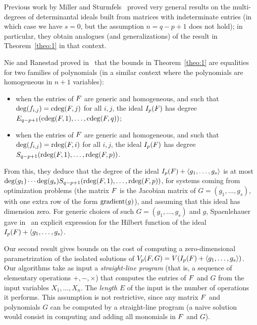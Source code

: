 \documentclass[12pt]{article}
\begin{document}
Previous work by Miller and Sturmfels~\cite[Chapter~15]{MiSt04} proved
very general results on the multi-degrees of determinantal ideals
built from matrices with indeterminate entries (in which case we have
$s=0$, but the assumption $n=q-p+1$ does not hold); in particular,
they obtain analogues (and generalizations) of the result in
Theorem~\ref{theo:1} in that context.

Nie and Ranestad proved in~\cite{NieRan09} that the bounds in
Theorem~\ref{theo:1} are equalities for two families of polynomials
(in a similar context where the polynomials are homogeneous in
$n+1$ variables):
\begin{itemize}
\item when the entries of ${F}$ are generic and homogeneous, and
 such that $\deg(f_{i,j}) = \mathrm{cdeg}({F},j)$ for all $i,j$, the ideal
 $I_p({F})$ has degree $E_{q-p+1}(\mathrm{cdeg}({F},1), \ldots, \mathrm{cdeg}({F},q))$;
\item when the entries of ${F}$ are  generic and homogeneous, and
  such that $\deg(f_{i,j}) = \mathrm{rdeg}({F},i)$ for all $i,j$, the
  ideal  $I_p({F})$ has degree $S_{q-p+1}(\mathrm{rdeg}({F},1), \ldots, \mathrm{rdeg}({F},p))$.
\end{itemize}
From this, they deduce that the degree of the ideal $I_p({F}) +
\langle g_1,\dots,g_s \rangle$ is at most \sloppy $\deg(g_1) \cdots
\deg(g_s) S_{q-p+1}(\mathrm{rdeg}({F},1), \ldots, \mathrm{rdeg}({F},p))$, for systems
coming from optimization problems (the matrix ${F}$ is the Jacobian
matrix of $G=(g_1,\dots,g_s)$, with one extra row of the form ${\rm
  gradient}(g)$), and assuming that this ideal has dimension zero.
For generic choices of such $G=(g_1,\dots,g_s)$ and $g$,
Spaenlehauer gave in~\cite{Spa14} an explicit expression for the
Hilbert function of the ideal $I_p({F}) + \langle g_1,\dots,g_s
\rangle$.

\smallskip

Our second result gives bounds on the cost of computing a
zero-dimensional parametrization of the isolated solutions of
$V_{p}({F},G)=V(I_p({F}) + \langle g_1,\dots,g_s \rangle)$. Our algorithms take as
input a \emph{straight-line program} (that is, a sequence of
elementary operations $+, -, \times$) that computes the entries of
${F}$ and $G$ from the input variables $X_1,\dots,X_n$. The
\emph{length $E$} of the input is the number of operations it
performs. This assumption is not restrictive, since any matrix ${F}$
and polynomials $G$ can be computed by a straight-line program
(a naive solution would consist in computing and adding all monomials
in ${F}$ and $G$).
\end{document}
